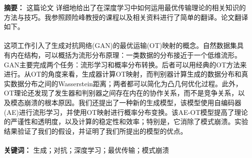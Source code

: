 \quad
\title{
}
\date{}
\maketitle
\thispagestyle{fancy}            %
\renewcommand{\headrulewidth}{1pt}      %

	\xiaosihao{}
	\noindent
	\textbf{摘要：}
	这篇论文 \cite{LEI2020361} 详细地给出了在深度学习中如何运用最优传输理论的相关知识的方法与技巧。我参照顾险峰教授的课程以及相关资料进行了简单的翻译。论文翻译如下。
	\\
	\\
	\noindent
	这项工作引入了生成对抗网络(GAN)的最优运输(OT)映射的概念。自然数据集具有内在结构，可以概括为流形分布原理：一类数据的分布接近于一个低维流形。GAN主要完成两个任务：流形学习和概率分布转换。后者可以用经典的OT方法来进行。从OT的角度来看，生成器计算OT映射，而判别器计算生成的数据分布和真实数据分布之间的Wasserstein距离；两者都可以简化为凸几何优化过程。此外，OT理论还发现了发生器和判别器之间存在内在的协作关系，而不是竞争关系，以及模态崩溃的根本原因。我们还提出了一种新的生成模型，该模型使用自编码器(AE)进行流形学习，并使用OT映射进行概率分布变换。该AE-OT模型提高了理论的严谨性和透明度，以及计算的稳定性和效率；特别是，它消除了模式崩溃。实验结果验证了我们的假设，并证明了我们所提出的模型的优点。
	\\
	\\
	\textbf{关键词：} 生成；对抗；深度学习；最优传输；模式崩溃
